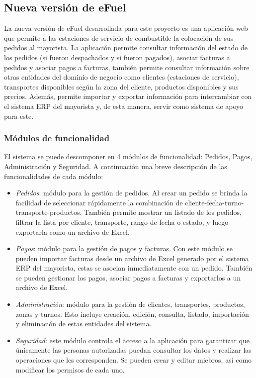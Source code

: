 \subsection{Nueva versión de eFuel}
La nueva versión de eFuel desarrollada para este proyecto es una aplicación web que permite a las estaciones de servicio de combustible la colocación de sus pedidos al mayorista. La aplicación permite consultar información del estado de los pedidos (si fueron despachados y si fueron pagados), asociar facturas a pedidos y asociar pagos a facturas, también permite consultar información sobre otras entidades del dominio de negocio como clientes (estaciones de servicio), transportes disponibles según la zona del cliente, productos disponibles y sus precios. Además, permite importar y exportar información para intercambiar con el sistema ERP del mayorista y, de esta manera, servir como sistema de apoyo para este.

\subsubsection{Módulos de funcionalidad}
El sistema se puede descomponer en 4 módulos de funcionalidad: Pedidos, Pagos, Administración y Seguridad. A continuación una breve descripción de las funcionalidades de cada módulo:

\begin{itemize}
    \item \emph{Pedidos}: módulo para la gestión de pedidos. Al crear un pedido se brinda la facilidad de seleccionar rápidamente la combinación de cliente-fecha-turno-transporte-productos. También permite mostrar un listado de los pedidos, filtrar la lista por cliente, transporte, rango de fecha o estado, y luego exportarla como un archivo de Excel. 
    \item \emph{Pagos}: módulo para la gestión de pagos y facturas. Con este módulo se pueden importar facturas desde un archivo de Excel generado por el sistema ERP del mayorista, estas se asocian inmediatamente con un pedido. También se pueden gestionar los pagos, asociar pagos a facturas y exportarlos a un archivo de Excel.
    \item \emph{Administración}: módulo para la gestión de clientes, transportes, productos, zonas y turnos. Esto incluye creación, edición, consulta, listado, importación y eliminación de estas entidades del sistema.
    \item \emph{Seguridad}: este módulo controla el acceso a la aplicación para garantizar que únicamente las personas autorizadas puedan consultar los datos y realizar las operaciones que les corresponden. Se pueden crear y editar miebros, así como modificar los permisos de cada uno.
\end{itemize}

